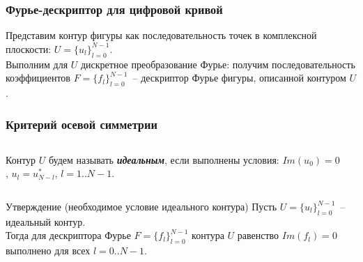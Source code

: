 \documentclass[11pt]{beamer}
\begin{document}
\begin{frame}
\frametitle{Фурье-дескриптор для цифровой кривой}
Представим контур фигуры как последовательность точек в комплексной плоскости: $U = \lbrace u_l \rbrace_{l=0}^{N-1}$.\\
Выполним для $U$ дискретное преобразование Фурье: получим последовательность коэффициентов $F = \lbrace f_l \rbrace _{l=0}^{N-1}$~-- дескриптор Фурье фигуры, описанной контуром $U$. \\
\begin{figure}[H]
\begin{minipage}[h]{0.45\linewidth}
\end{minipage}
\hfill
\begin{minipage}[h]{0.45\linewidth}
\end{minipage}
\end{figure}
\end{frame}

\begin{frame}
\frametitle{Критерий осевой симметрии}
\begin{columns}
\begin{column}{0.5\textwidth}
Контур $U$ будем называть \textbf{\textit{идеальным}}, если выполнены условия: $Im(u_0) = 0$, $u_l = u_{N-l}^*$, $l = 1..N-1.$
\end{column}
\begin{column}{0.5\textwidth}
\end{column}
\end{columns}
\begin{block}{Утверждение (необходимое условие идеального контура)}
Пусть $U = \{u_l\}_{l=0}^{N-1}$~-- идеальный контур. \\
Тогда для дескриптора Фурье $F = \{ f_l \}_{l=0}^{N-1}$ контура $U$ равенство $Im(f_l)=0$ выполнено для всех $l = 0..N-1.$
\end{block}
\end{frame}
\end{document}
